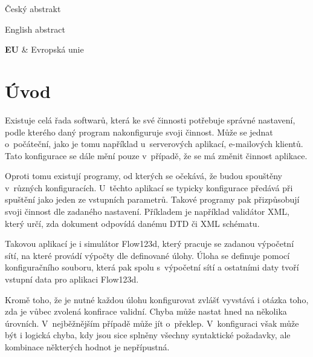 \documentclass[FM,DP]{tulthesis}
\begin{document}

\begin{abstractCZ}
Český abstrakt
\end{abstractCZ}

\vspace{2cm}
\begin{abstractEN}
English abstract
\end{abstractEN}

\begin{acknowledgement}

\end{acknowledgement}

\tableofcontents
\clearpage

\begin{abbrList}
\textbf{EU} & Evropská unie \\
\end{abbrList}

\chapter{Úvod}

Existuje celá řada softwarů, která ke své činnosti potřebuje správné nastavení, podle kterého daný program nakonfiguruje svoji činnost. Může se jednat o~počáteční, jako je tomu například u~serverových aplikací, e-mailových klientů. Tato konfigurace se dále mění pouze v~případě, že se má změnit činnost aplikace.

Oproti tomu existují programy, od kterých se očekává, že budou spouštěny v~různých konfiguracích. U~těchto aplikací se typicky konfigurace předává při spuštění jako jeden ze vstupních parametrů. Takové programy pak přizpůsobují svoji činnost dle zadaného nastavení. Příkladem je například validátor XML, který určí, zda dokument odpovídá danému DTD či XML schématu.

Takovou aplikací je i simulátor Flow123d, který pracuje se zadanou výpočetní sítí, na které provádí výpočty dle definované úlohy. Úloha se definuje pomocí konfiguračního souboru, která pak spolu s~výpočetní sítí a ostatními daty tvoří vstupní data pro aplikaci Flow123d.

Kromě toho, že je nutné každou úlohu konfigurovat zvlášť vyvstává i otázka toho, zda je vůbec zvolená konfirace validní. Chyba může nastat hned na několika úrovních. V~nejběžnějším případě může jít o~překlep. V~konfiguraci však může být i logická chyba, kdy jsou sice splněny všechny syntaktické požadavky, ale kombinace některých hodnot je nepřípustná.
\end{document}
